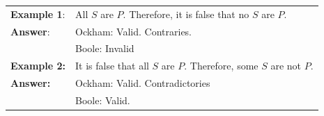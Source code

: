 \begin{longtabu}{p{.15\linewidth}p{.75\linewidth}}
\textbf{Example 1}: & All $S$ are $P$. Therefore, it is false that no $S$ are $P$.   \\
\textbf{Answer}: & Ockham: Valid. Contraries.\\
& Boole: Invalid \\
\textbf{Example 2:} & It is false that all $S$ are $P$. Therefore, some $S$ are not $P$.\\
\textbf{Answer:} & Ockham: Valid. Contradictories \\
& Boole: Valid.
\end{longtabu}


